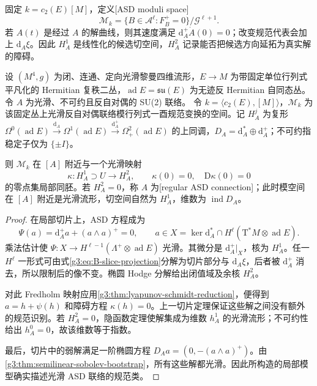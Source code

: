固定 \(k=c_2(E)[M]\)，定义[ASD moduli space]
\[
 \mathcal M_k=\{B\in\mathcal A^\ell:F_B^+=0\}/\mathcal G^{\ell+1}.
\]
若 \(A(t)\) 是经过 \(A\) 的解曲线，则其速度满足 \(\mathrm d_A^+\dot A(0)=0\)；改变规范代表会加上 \(\mathrm d_A\xi\)。因此 \(H_A^1\) 是线性化的候选切空间，\(H_A^2\) 记录能否把候选方向延拓为真实解的障碍。

\begin{theorem}\label{g3:thm:B-asd-local-model}
	设 \((M^4,g)\) 为闭、连通、定向光滑黎曼四维流形，\(E\to M\) 为带固定单位行列式平凡化的 Hermitian 复秩二丛，\(\operatorname{ad}E=\mathfrak{su}(E)\) 为无迹反 Hermitian 自同态丛。令 \(A\) 为光滑、不可约且反自对偶的 SU(2) 联络。
	令 \(k=\langle c_2(E),[M]\rangle\)，\(\mathcal M_k\) 为该固定丛上光滑反自对偶联络模行列式一酉规范变换的空间。记 \(H_A^j\) 为复形 \(\Omega^0(\operatorname{ad}E)\xrightarrow{\mathrm d_A}\Omega^1(\operatorname{ad}E)\xrightarrow{\mathrm d_A^+}\Omega^2_+(\operatorname{ad}E)\) 的上同调，\(D_A=\mathrm d_A^*\oplus\mathrm d_A^+\)；不可约指稳定子仅为 \(\{\pm I\}\)。

 则 \(\mathcal M_k\) 在 \([A]\) 附近与一个光滑映射
 \[
  \kappa:H_A^1\supset U\longrightarrow H_A^2,
  \qquad\kappa(0)=0,\quad\mathrm D\kappa(0)=0
 \]
 的零点集局部同胚。若 \(H_A^2=0\)，称 \(A\) 为[regular ASD connection]；此时模空间在 \([A]\) 附近是光滑流形，切空间自然为 \(H_A^1\)，维数为 \(\operatorname{ind}D_A\)。
\end{theorem}
\begin{proof}
 在局部切片上，ASD 方程成为
 \[
  \Psi(a)=\mathrm d_A^+a+(a\wedge a)^+=0,
  \qquad a\in X=\ker \mathrm d_A^*\cap H^\ell(\mathrm T^*M\otimes\operatorname{ad}E).
 \]
 乘法估计使 \(\Psi:X\to H^{\ell-1}(\Lambda^+\otimes\operatorname{ad}E)\) 光滑。其微分是 \(\mathrm d_A^+|_X\)，核为 \(H_A^1\)。任一 \(H^\ell\) 一形式可由式\eqref{g3:eq:B-slice-projection}分解为切片部分与 \(\mathrm d_A\xi\)，后者被 \(\mathrm d_A^+\) 消去，所以限制后的像不变。椭圆 Hodge 分解给出闭值域及余核 \(H_A^2\)。

 对此 Fredholm 映射应用\cref{g3:thm:lyapunov-schmidt-reduction}，便得到 \(a=h+\psi(h)\) 和障碍方程 \(\kappa(h)=0\)。上一切片定理保证这些解之间没有额外的规范识别。若 \(H_A^2=0\)，隐函数定理使解集成为维数 \(h_A^1\) 的光滑流形；不可约性给出 \(h_A^0=0\)，故该维数等于指数。

 最后，切片中的弱解满足一阶椭圆方程
 \(D_Aa=(0,-(a\wedge a)^+)\)。由\cref{g3:thm:semilinear-sobolev-bootstrap}，所有这些解都光滑。因此所构造的局部模型确实描述光滑 ASD 联络的规范类。
\end{proof}

